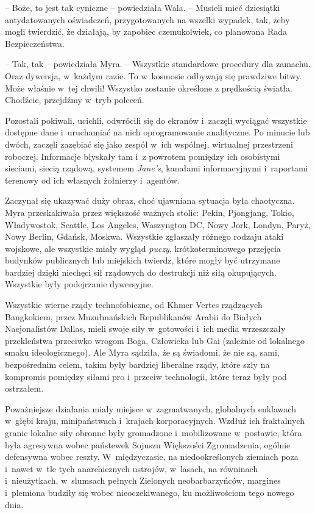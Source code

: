 \documentclass[oneside,polish,11pt,sfheadings]{mwbk}
\begin{document}
-- Boże, to jest tak cyniczne -- powiedziała Wala. -- Musieli mieć
dziesiątki antydatowanych oświadczeń, przygotowanych na wszelki wypadek,
tak, żeby mogli twierdzić, że działają, by zapobiec czemukolwiek, co
planowana Rada Bezpieczeństwa.

-- Tak, tak -- powiedziała Myra. -- Wszystkie standardowe procedury dla
zamachu. Oraz dywersja, w~każdym razie. To w~kosmosie odbywają się
prawdziwe bitwy. Może właśnie w~tej chwili! Wszystko zostanie określone
z prędkością światła. Chodźcie, przejdźmy w~tryb poleceń.

Pozostali pokiwali, ucichli, odwrócili się do ekranów i~zaczęli wyciągać
wszystkie dostępne dane i~uruchamiać na nich oprogramowanie analityczne.
Po minucie lub dwóch, zaczęli zazębiać się jako zespół w~ich wspólnej,
wirtualnej przestrzeni roboczej. Informacje błyskały tam i~z powrotem
pomiędzy ich osobistymi sieciami, siecią rządową, systemem
\textit{Jane's}, kanałami informacyjnymi i~raportami terenowy od ich
własnych żołnierzy i~agentów.

Zaczynał się ukazywać duży obraz, choć ujawniana sytuacja była
chaotyczna. Myra przeskakiwała przez większość ważnych stolic: Pekin,
Pjongjang, Tokio, Władywostok, Seattle, Los Angeles, Waszyngton DC, Nowy
Jork, Londyn, Paryż, Nowy Berlin, Gdańsk, Moskwa. Wszystkie zgłaszały
różnego rodzaju ataki wojskowe, ale wszystkie miały wygląd \textit{puczy},
krótkoterminowego przejęcia budynków publicznych lub miejskich twierdz,
które mogły być utrzymane bardziej dzięki niechęci sił rządowych do
destrukcji niż siłą okupujących. Wszystkie były podejrzanie dywersyjne.

Wszystkie wierne rządy technofobiczne, od Khmer Vertes rządzących
Bangkokiem, przez Muzułmańskich Republikanów Arabii do Białych
Nacjonalistów Dallas, mieli swoje siły w~gotowości i~ich media
wrzeszczały przekleństwa przeciwko wrogom Boga, Człowieka lub Gai
(zależnie od lokalnego smaku ideologicznego). Ale Myra sądziła, że są
świadomi, że nie są, sami, bezpośrednim celem, takim były bardziej
liberalne rządy, które szły na kompromis pomiędzy siłami pro i~przeciw
technologii, które teraz były pod ostrzałem.

Poważniejsze działania miały miejsce w~zagmatwanych, globalnych
enklawach w~głębi kraju, minipaństwach i~krajach korporacyjnych. Wzdłuż
ich fraktalnych granic lokalne siły obronne były gromadzone i~mobilizowane w~postawie, która była agresywna wobec państewek Sojuszu
Większości Zgromadzenia, ogólnie defensywna wobec reszty. W~międzyczasie, na niedookreślonych ziemiach poza i~nawet w~tle tych
anarchicznych ustrojów, w~lasach, na równinach i~nieużytkach, w~slumsach
pełnych Zielonych neobarbarzyńców, margines i~plemiona budziły się wobec
nieoczekiwanego, ku możliwościom tego nowego dnia.
\end{document}
